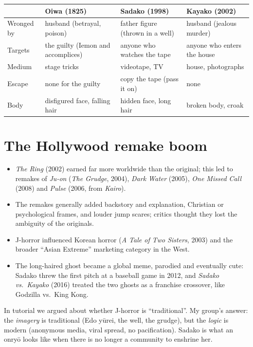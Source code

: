 \begin{center}
\begin{tabular}{p{2.8cm}p{3.4cm}p{3.4cm}p{3.4cm}}
\toprule
 & Oiwa (1825) & Sadako (1998) & Kayako (2002) \\
\midrule
Wronged by & husband (betrayal, poison) & father figure (thrown in a well) & husband (jealous murder) \\
Targets & the guilty (Iemon and accomplices) & anyone who watches the tape & anyone who enters the house \\
Medium & stage tricks & videotape, TV & house, photographs \\
Escape & none for the guilty & copy the tape (pass it on) & none \\
Body & disfigured face, falling hair & hidden face, long hair & broken body, croak \\
\bottomrule
\end{tabular}
\end{center}

\section{The Hollywood remake boom}

\begin{itemize}
  \item \emph{The Ring} (2002) earned far more worldwide than the original; this led to
        remakes of \emph{Ju-on} (\emph{The Grudge}, 2004), \emph{Dark Water} (2005),
        \emph{One Missed Call} (2008) and \emph{Pulse} (2006, from \emph{Kairo}).
  \item The remakes generally added backstory and explanation, Christian or psychological
        frames, and louder jump scares; critics thought they lost the ambiguity of the
        originals.
  \item J-horror influenced Korean horror (\emph{A Tale of Two Sisters}, 2003) and the
        broader ``Asian Extreme'' marketing category in the West.
  \item The long-haired ghost became a global meme, parodied and eventually cute: Sadako
        threw the first pitch at a baseball game in 2012, and \emph{Sadako vs.\ Kayako}
        (2016) treated the two ghosts as a franchise crossover, like Godzilla vs.\ King
        Kong.
\end{itemize}

\begin{aside}
In tutorial we argued about whether J-horror is ``traditional''. My group's answer: the
\emph{imagery} is traditional (Edo yūrei, the well, the grudge), but the \emph{logic} is
modern (anonymous media, viral spread, no pacification). Sadako is what an onryō looks
like when there is no longer a community to enshrine her.
\end{aside}

